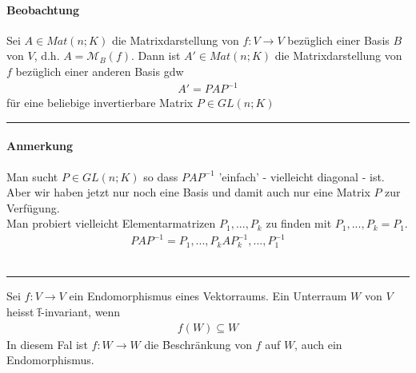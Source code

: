 \paragraph{Beobachtung}
Sei $A \in Mat(n;K)$ die Matrixdarstellung von $f: V \rightarrow V$ bezüglich einer Basis $B$ von $V$, d.h. $A = \mathcal{M}_{B} (f)$. Dann ist $A' \in Mat(n;K)$ die Matrixdarstellung von $f$ bezüglich einer anderen Basis gdw
\begin{align}
A' = P A P^{-1}
\end{align}
für eine beliebige invertierbare Matrix $P \in GL(n;K)$
\vspace*{0.2cm} \\ \rule{\linewidth}{0.3mm}\vspace*{0.1cm}
\paragraph{Anmerkung} Man sucht $P \in GL(n;K)$ so dass $P A P^{-1}$ 'einfach' - vielleicht diagonal - ist. Aber wir haben jetzt nur noch eine Basis und damit auch nur eine Matrix $P$ zur Verfügung. \\
\footnotesize Man probiert vielleicht Elementarmatrizen $P_1, ..., P_k$ zu finden mit $P_1, ..., P_k = P_1$.
\begin{align}
P A P^{-1} = P_1, ..., P_k A P_{k}^{-1}, ..., P_{1}^{-1}
\end{align}
\normalsize
\vspace*{0.2cm} \\ \rule{\linewidth}{0.3mm}\vspace*{0.1cm}
Sei $f: V \rightarrow V$ ein Endomorphismus eines Vektorraums. Ein Unterraum $W$ von $V$ heisst \f{f-invariant}, wenn
\begin{align}
f(W) \subseteq W
\end{align}
In diesem Fal ist $f: W \rightarrow W$ die \f{Beschränkung von $f$ auf $W$}, auch ein Endomorphismus.

